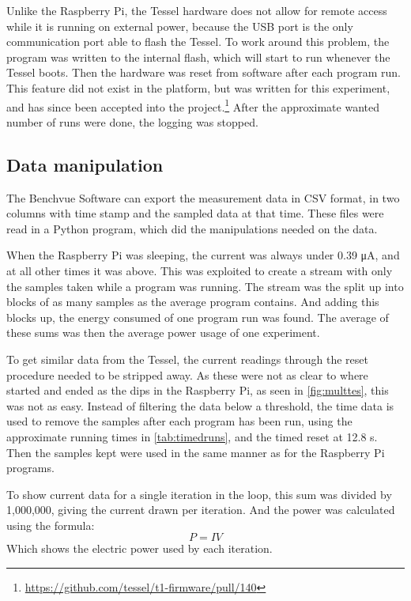 Unlike the Raspberry Pi, the Tessel hardware does not allow for remote access while it is running on external power, because the USB port is the only communication port able to flash the Tessel.
To work around this problem, the program was written to the internal flash, which will start to run whenever the Tessel boots.
Then the hardware was reset from software after each program run.
This feature did not exist in the platform, but was written for this experiment, and has since been accepted into the project.\footnote{\url{https://github.com/tessel/t1-firmware/pull/140}}
After the approximate wanted number of runs were done, the logging was stopped.

\subsection{Data manipulation}
The Benchvue Software can export the measurement data in CSV format, in two columns with time stamp and the sampled data at that time.
These files were read in a Python program, which did the manipulations needed on the data.

When the Raspberry Pi was sleeping, the current was always under 0.39 \si{\micro\ampere}, and at all other times it was above.
This was exploited to create a stream with only the samples taken while a program was running.
The stream was the split up into blocks of as many samples as the average program contains.
And adding this blocks up, the energy consumed of one program run was found.
The average of these sums was then the average power usage of one experiment.

To get similar data from the Tessel, the current readings through the reset procedure needed to be stripped away.
As these were not as clear to where started and ended as the dips in the Raspberry Pi, as seen in \cref{fig:multtes}, this was not as easy.
Instead of filtering the data below a threshold, the time data is used to remove the samples after each program has been run, using the approximate running times in \cref{tab:timedruns}, and the timed reset at 12.8 \si{\second}.
Then the samples kept were used in the same manner as for the Raspberry Pi programs.

To show current data for a single iteration in the loop, this sum was divided by 1,000,000, giving the current drawn per iteration.
And the power was calculated using the formula:
\[P = IV\]
Which shows the electric power used by each iteration.